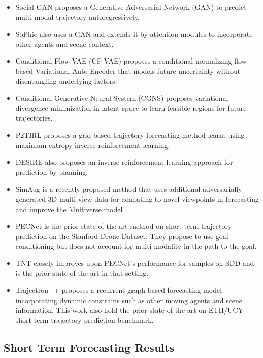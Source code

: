 \documentclass[final]{cvpr}
\begin{document}
\begin{itemize}
    \item Social GAN \cite{gupta2018social} proposes a Generative Adversarial Network (GAN) to predict multi-modal trajectory autoregressively.   
    \item SoPhie \cite{sadeghian2019sophie} also uses a GAN and extends it by attention modules to incorporate other agents and scene context.
    \item Conditional Flow VAE (CF-VAE) \cite{bhattacharyya2019conditional} proposes a conditional normalizing flow based Variational Auto-Encoder that models future uncertainty without disentangling underlying factors.
    \item Conditional Generative Neural System (CGNS) \cite{li2019conditional} proposes variational divergence minimization in latent space to learn feasible regions for future trajectories. 
    \item P2TIRL \cite{deo2020trajectory} proposes a grid based trajectory forecasting method learnt using maximum entropy inverse reinforcement learning. 
    \item DESIRE \cite{lee2017desire} also proposes an inverse reinforcement learning approach for prediction by planning.
    \item SimAug \cite{liang2020simaug} is a recently proposed method that uses additional adversarially generated 3D multi-view data for adapating to novel viewpoints in forecasting and improve the Multiverse model \cite{liang2020garden}.
    \item PECNet \cite{mangalam2020not} is the prior state-of-the art method on short-term trajectory prediction on the Stanford Drone Dataset. They propose to use goal-conditioning but does not account for multi-modality in the path to the goal.
    \item TNT \cite{zhao2020tnt} closely improves upon PECNet's performance for  samples on SDD and is the prior state-of-the-art in that setting.
    \item Trajectron++ \cite{salzmann2020trajectron++} proposes a recurrent graph based forecasting model incorporating dynamic constrains such as other moving agents and scene information.  This work also hold the prior state-of-the art on ETH/UCY short-term trajectory prediction benchmark.
\end{itemize}



\subsection{Short Term Forecasting Results}
\end{document}

